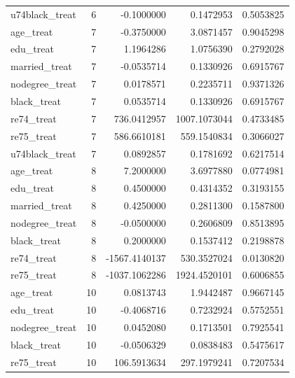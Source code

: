 \documentclass[
]{article}
\begin{document}
\begin{longtable}[]{@{}lrrrr@{}}
u74black\_treat & 6 & -0.1000000 & 0.1472953 & 0.5053825 \\
age\_treat & 7 & -0.3750000 & 3.0871457 & 0.9045298 \\
edu\_treat & 7 & 1.1964286 & 1.0756390 & 0.2792028 \\
married\_treat & 7 & -0.0535714 & 0.1330926 & 0.6915767 \\
nodegree\_treat & 7 & 0.0178571 & 0.2235711 & 0.9371326 \\
black\_treat & 7 & 0.0535714 & 0.1330926 & 0.6915767 \\
re74\_treat & 7 & 736.0412957 & 1007.1073044 & 0.4733485 \\
re75\_treat & 7 & 586.6610181 & 559.1540834 & 0.3066027 \\
u74black\_treat & 7 & 0.0892857 & 0.1781692 & 0.6217514 \\
age\_treat & 8 & 7.2000000 & 3.6977880 & 0.0774981 \\
edu\_treat & 8 & 0.4500000 & 0.4314352 & 0.3193155 \\
married\_treat & 8 & 0.4250000 & 0.2811300 & 0.1587800 \\
nodegree\_treat & 8 & -0.0500000 & 0.2606809 & 0.8513895 \\
black\_treat & 8 & 0.2000000 & 0.1537412 & 0.2198878 \\
re74\_treat & 8 & -1567.4140137 & 530.3527024 & 0.0130820 \\
re75\_treat & 8 & -1037.1062286 & 1924.4520101 & 0.6006855 \\
age\_treat & 10 & 0.0813743 & 1.9442487 & 0.9667145 \\
edu\_treat & 10 & -0.4068716 & 0.7232924 & 0.5752551 \\
nodegree\_treat & 10 & 0.0452080 & 0.1713501 & 0.7925541 \\
black\_treat & 10 & -0.0506329 & 0.0838483 & 0.5475617 \\
re75\_treat & 10 & 106.5913634 & 297.1979241 & 0.7207534 \\
\end{longtable}
\end{document}
